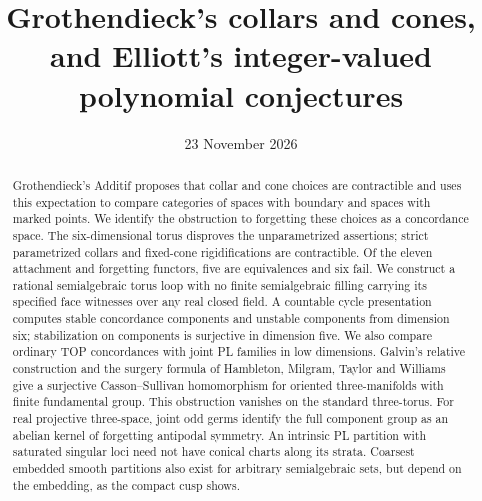 \documentclass[11pt,a4paper]{article}
\title{Grothendieck's collars and cones, and Elliott's integer-valued polynomial conjectures}
\author{}
\date{23 November 2026}
\theoremstyle{definition}
\begin{document}
\maketitle
\begin{abstract}
Grothendieck's Additif proposes that collar and cone choices are
contractible and uses this expectation to compare categories of spaces
with boundary and spaces with marked points. We identify the obstruction
to forgetting these choices as a concordance space. The six-dimensional
torus disproves the unparametrized assertions; strict parametrized collars
and fixed-cone rigidifications are contractible. Of the eleven attachment
and forgetting functors, five are equivalences and six fail.
We construct a rational semialgebraic torus loop with no finite
semialgebraic filling carrying its specified face witnesses over any
real closed field. A countable cycle presentation computes stable
concordance components and unstable components from dimension six;
stabilization on components is surjective in dimension five.
We also compare ordinary TOP concordances with joint PL families in
low dimensions. Galvin's relative construction and the surgery formula
of Hambleton, Milgram, Taylor and Williams give a surjective
Casson--Sullivan homomorphism for oriented three-manifolds with finite
fundamental group. This obstruction vanishes on the standard three-torus.
For real projective three-space, joint odd germs
identify the full component group as an abelian kernel of forgetting
antipodal symmetry. An intrinsic PL partition with saturated singular
loci need not have conical charts along its strata. Coarsest embedded
smooth partitions also exist for arbitrary semialgebraic sets,
but depend on the embedding, as the compact cusp shows.


\end{abstract}
\end{document}
